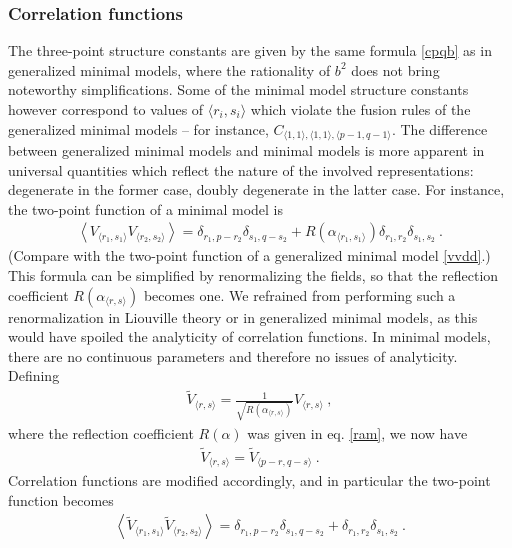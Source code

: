 \documentclass[12pt, a4paper, notitlepage, twoside]{report}
\numberwithin{equation}{section}
\theoremstyle{break}
\begin{document}
\subsubsection{Correlation functions}

The three-point structure constants are given by the same formula \eqref{cpqb} as in generalized minimal models, where the rationality of $b^2$ does not bring noteworthy simplifications. 
Some of the minimal model structure constants however correspond to values of $\langle r_i,s_i\rangle$ which violate the fusion rules of the generalized minimal models -- for instance, $C_{\langle 1,1\rangle,\langle 1,1\rangle,\langle p-1,q-1\rangle}$. 
The difference between generalized minimal models and minimal models is more apparent in universal quantities which reflect the nature of the involved representations: degenerate in the former case, doubly degenerate in the latter case.
For instance, the two-point function of a minimal model is 
\begin{align}
 \left\langle V_{\langle r_1,s_1 \rangle} V_{\langle r_2,s_2 \rangle} \right\rangle = \delta_{r_1,p-r_2}\delta_{s_1,q-s_2} + R(\alpha_{\langle r_1,s_1 \rangle}) \delta_{r_1,r_2} \delta_{s_1,s_2} \ .
\label{vvddp}
\end{align}
(Compare with the two-point function of a generalized minimal model \eqref{vvdd}.) This formula can be simplified by renormalizing the fields, so that the reflection coefficient $R(\alpha_{\langle r,s\rangle})$ becomes one.
We refrained from performing such a renormalization in Liouville theory or in generalized minimal models, as this would have spoiled the analyticity of correlation functions.
In minimal models, there are no continuous parameters and therefore no issues of analyticity.
Defining
\begin{align}
 \boxed{\tilde{V}_{\langle r,s \rangle} = \frac{1}{\sqrt{R(\alpha_{\langle r,s \rangle})}} V_{\langle r,s \rangle}}\ , 
\end{align}
where the reflection coefficient $R(\alpha)$ was given in eq. \eqref{ram}, we now have 
\begin{align}
 \tilde{V}_{\langle r,s \rangle} = \tilde{V}_{\langle p-r,q-s \rangle}\ .
\end{align}
Correlation functions are modified accordingly, and in particular the two-point function becomes
\begin{align}
 \boxed{\left\langle \tilde{V}_{\langle r_1,s_1 \rangle} \tilde{V}_{\langle r_2,s_2 \rangle} \right\rangle = \delta_{r_1,p-r_2}\delta_{s_1,q-s_2} + \delta_{r_1,r_2} \delta_{s_1,s_2}} \ .
\end{align}
\end{document}
